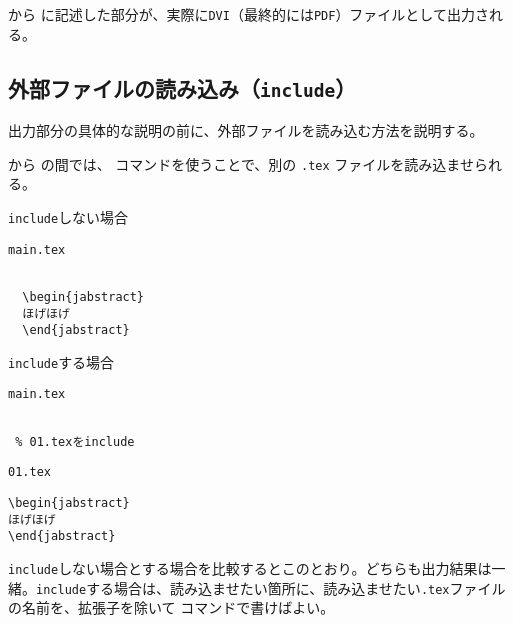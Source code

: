 \verb|| から \verb|| に記述した部分が、実際に{\tt DVI}（最終的には{\tt PDF}）ファイルとして出力される。

\subsection{外部ファイルの読み込み（{\tt include}）}

出力部分の具体的な説明の前に、外部ファイルを読み込む方法を説明する。

\verb|| から \verb|| の間では、\verb|| コマンドを使うことで、別の {\tt *.tex} ファイルを読み込ませられる。 

\begin{itembox}[l]{{\tt include}しない場合}
\begin{itembox}[l]{{\tt main.tex}}
\begin{verbatim}

  \begin{jabstract}
  ほげほげ
  \end{jabstract}

\end{verbatim}
\end{itembox}
\end{itembox}

\begin{itembox}[l]{{\tt include}する場合}
\begin{minipage}{0.5\hsize}
\begin{itembox}[l]{{\tt main.tex}}
\begin{verbatim}

 % 01.texをinclude

\end{verbatim}
\end{itembox}
\end{minipage}
\begin{minipage}{0.5\hsize}
\begin{itembox}[l]{{\tt 01.tex}}
\begin{verbatim}
\begin{jabstract}
ほげほげ
\end{jabstract}
\end{verbatim}
\end{itembox}
\end{minipage}
\end{itembox}

{\tt include}しない場合とする場合を比較するとこのとおり。どちらも出力結果は一緒。{\tt include}する場合は、読み込ませたい箇所に、読み込ませたい{\tt *.tex}ファイルの名前を、拡張子を除いて \verb|| コマンドで書けばよい。

